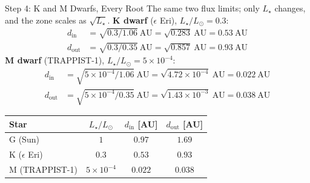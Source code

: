 \documentclass[aspectratio=169, 11pt]{beamer}
\begin{document}
\begin{frame}{Step 4: K and M Dwarfs, Every Root}
  \small
  The same two flux limits; only $L_\star$ changes, and the zone scales as $\sqrt{L_\star}$.
  \vskip4pt
  \textbf{K dwarf} ($\epsilon$ Eri), $L_\star/L_\odot = 0.3$:
  \[
    \begin{aligned}
      d_{\mathrm{in}} &= \sqrt{0.3/1.06}\ \mathrm{AU} = \sqrt{0.283}\ \mathrm{AU} = 0.53\ \mathrm{AU} \\
      d_{\mathrm{out}} &= \sqrt{0.3/0.35}\ \mathrm{AU} = \sqrt{0.857}\ \mathrm{AU} = 0.93\ \mathrm{AU}
    \end{aligned}
  \]
  \textbf{M dwarf} (TRAPPIST-1), $L_\star/L_\odot = 5 \times 10^{-4}$:
  \[
    \begin{aligned}
      d_{\mathrm{in}} &= \sqrt{5 \times 10^{-4}/1.06}\ \mathrm{AU} = \sqrt{4.72 \times 10^{-4}}\ \mathrm{AU} = 0.022\ \mathrm{AU} \\
      d_{\mathrm{out}} &= \sqrt{5 \times 10^{-4}/0.35}\ \mathrm{AU} = \sqrt{1.43 \times 10^{-3}}\ \mathrm{AU} = 0.038\ \mathrm{AU}
    \end{aligned}
  \]
  \begin{center}
    \small
    \begin{tabular}{l c c c}
      \toprule
      Star & $L_\star/L_\odot$ & $d_{\mathrm{in}}$ [AU] & $d_{\mathrm{out}}$ [AU] \\
      \midrule
      G (Sun) & $1$ & $0.97$ & $1.69$ \\
      K ($\epsilon$ Eri) & $0.3$ & $0.53$ & $0.93$ \\
      M (TRAPPIST-1) & $5 \times 10^{-4}$ & $0.022$ & $0.038$ \\
      \bottomrule
    \end{tabular}
  \end{center}
\end{frame}
\end{document}
